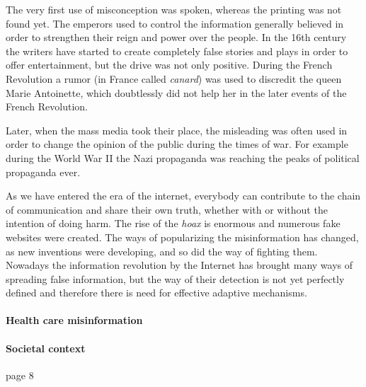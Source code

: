 \documentclass[11pt ,english,a4paper]{article}
\begin{document}
The very first use of misconception was spoken, whereas the printing was not found yet. The emperors used to control the information generally believed in order to strengthen their reign and power over the people. \cite{bur17history} In the 16th century the writers have started to create completely false stories and plays in order to offer entertainment, but the drive was not only positive. During the French Revolution a rumor (in France called \emph{canard}) was used to discredit the queen Marie Antoinette, which doubtlessly did not help her in the later events of the French Revolution. \cite{bur17history} 

Later, when the mass media took their place, the misleading was often used in order to change the opinion of the public during the times of war. For example during the World War II the Nazi propaganda was reaching the peaks of political propaganda ever. \cite{pos18short}

As we have entered the era of the internet, everybody can contribute to the chain of communication and share their own truth, whether with or without the intention of doing harm. The rise of the \emph{hoax} is enormous and numerous fake websites were created.\cite{bur17history} The ways of popularizing the misinformation has changed, as new inventions were developing, and so did the way of fighting them. Nowadays the information revolution by the Internet has brought many ways of spreading false information, but the way of their detection is not yet perfectly defined and therefore there is need for effective adaptive mechanisms.

\paragraph{Health care misinformation}

\cite{wa19sys}\cite{cook15misinfo}

\paragraph{Societal context}%
\cite{who22infodemics} page 8 \cite{wa19sys}
\end{document}
